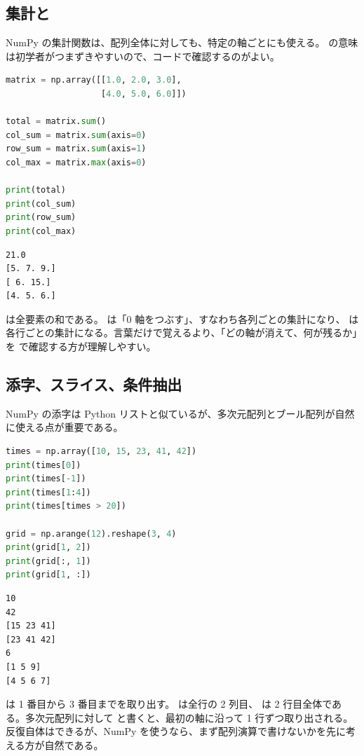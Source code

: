 \subsection{集計と }

NumPy の集計関数は、配列全体に対しても、特定の軸ごとにも使える。 の意味は初学者がつまずきやすいので、コードで確認するのがよい。

\begin{lstlisting}[language=Python]
matrix = np.array([[1.0, 2.0, 3.0],
                   [4.0, 5.0, 6.0]])

total = matrix.sum()
col_sum = matrix.sum(axis=0)
row_sum = matrix.sum(axis=1)
col_max = matrix.max(axis=0)

print(total)
print(col_sum)
print(row_sum)
print(col_max)
\end{lstlisting}

\begin{lstlisting}[numbers=none, xleftmargin=2\zw]
21.0
[5. 7. 9.]
[ 6. 15.]
[4. 5. 6.]
\end{lstlisting}

 は全要素の和である。 は「0 軸をつぶす」、すなわち各列ごとの集計になり、 は各行ごとの集計になる。言葉だけで覚えるより、「どの軸が消えて、何が残るか」を  で確認する方が理解しやすい。

\subsection{添字、スライス、条件抽出}

NumPy の添字は Python リストと似ているが、多次元配列とブール配列が自然に使える点が重要である。

\begin{lstlisting}[language=Python]
times = np.array([10, 15, 23, 41, 42])
print(times[0])
print(times[-1])
print(times[1:4])
print(times[times > 20])

grid = np.arange(12).reshape(3, 4)
print(grid[1, 2])
print(grid[:, 1])
print(grid[1, :])
\end{lstlisting}

\begin{lstlisting}[numbers=none, xleftmargin=2\zw]
10
42
[15 23 41]
[23 41 42]
6
[1 5 9]
[4 5 6 7]
\end{lstlisting}

 は 1 番目から 3 番目までを取り出す。 は全行の 2 列目、 は 2 行目全体である。多次元配列に対して  と書くと、最初の軸に沿って 1 行ずつ取り出される。反復自体はできるが、NumPy を使うなら、まず配列演算で書けないかを先に考える方が自然である。

